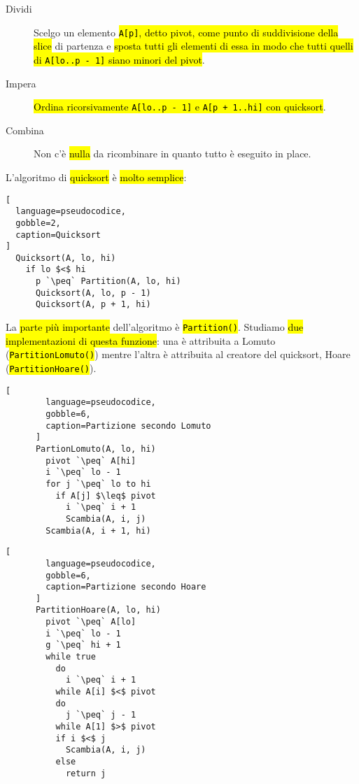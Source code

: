 \documentclass[a4paper,11pt,oneside]{article}
\theoremstyle{plain}
\theoremstyle{definition}
\theoremstyle{remark}
\newcommand{\peq}{$\gets$}
\begin{document}
\begin{description}
  \item[Dividi] Scelgo un elemento \hl{\texttt{A[p]}, detto pivot, come punto di
    suddivisione della slice} di partenza e \hl{sposta tutti gli elementi di
    essa in modo che tutti quelli di \texttt{A[lo..p - 1]} siano minori del
    pivot}.
  \item[Impera] \hl{Ordina ricorsivamente \texttt{A[lo..p - 1]} e
    \texttt{A[p + 1..hi]} con quicksort}.
  \item[Combina] Non c'è \hl{nulla} da ricombinare in quanto tutto è eseguito in
    place.
\end{description}

L'algoritmo di \hl{quicksort} è \hl{molto semplice}:

\begin{lstlisting}[
  language=pseudocodice,
  gobble=2,
  caption=Quicksort
]
  Quicksort(A, lo, hi)
    if lo $<$ hi
      p `\peq` Partition(A, lo, hi)
      Quicksort(A, lo, p - 1)
      Quicksort(A, p + 1, hi)
\end{lstlisting}

La \hl{parte più importante} dell'algoritmo è \hl{\texttt{Partition()}}.
Studiamo \hl{due implementazioni di questa funzione}: una è attribuita a Lomuto
(\hl{\texttt{PartitionLomuto()}}) mentre l'altra è attribuita al creatore del
quicksort, Hoare (\hl{\texttt{PartitionHoare()}}).

\noindent\begin{minipage}{\textwidth}
  \centering
  \begin{minipage}{0.45\textwidth}
    \centering
    \begin{lstlisting}[
        language=pseudocodice,
        gobble=6,
        caption=Partizione secondo Lomuto
      ]
      PartionLomuto(A, lo, hi)
        pivot `\peq` A[hi]
        i `\peq` lo - 1
        for j `\peq` lo to hi
          if A[j] $\leq$ pivot
            i `\peq` i + 1
            Scambia(A, i, j)
        Scambia(A, i + 1, hi)
    \end{lstlisting}
  \end{minipage}
  \begin{minipage}{0.45\textwidth}
    \centering
    \begin{lstlisting}[
        language=pseudocodice,
        gobble=6,
        caption=Partizione secondo Hoare
      ]
      PartitionHoare(A, lo, hi)
        pivot `\peq` A[lo]
        i `\peq` lo - 1
        g `\peq` hi + 1
        while true
          do
            i `\peq` i + 1
          while A[i] $<$ pivot
          do
            j `\peq` j - 1
          while A[1] $>$ pivot
          if i $<$ j
            Scambia(A, i, j)
          else
            return j
    \end{lstlisting}
  \end{minipage}
\end{minipage}
\end{document}
